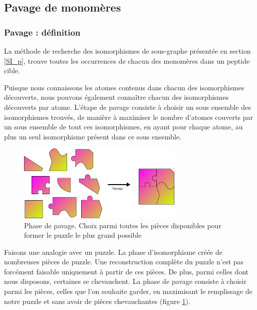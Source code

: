 \subsection{Pavage de monomères}
\label{pavage_}

\subsubsection{Pavage : définition}

La méthode de recherche des isomorphismes de sous-graphe présentée en section \ref{SI_p}, trouve toutes les occurrences de chacun des monomères dans un peptide cible.

Puisque nous connaissons les atomes contenus dans chacun des isomorphismes découverts, nous pouvons également connaître chacun des isomorphismes découverts par atome.
L'étape de pavage consiste à choisir un sous ensemble des isomorphismes trouvés, de manière à maximiser le nombre d'atomes couverts par un sous ensemble de tout ces isomorphismes, en ayant pour chaque atome, au plus un seul isomorphisme présent dans ce sous ensemble.

\begin{figure}[!ht]
  \begin{center}
    \includegraphics[width=300px]{Figures/s2m/pavage/puzzle.png}
    \caption{\label{puzzle}Phase de pavage.
    Choix parmi toutes les pièces disponibles pour former le puzzle le plus grand possible}
  \end{center}
\end{figure}

Faisons une analogie avec un puzzle. La phase d'isomorphisme créée de nombreuses pièces de puzzle.
Une reconstruction complète du puzzle n'est pas forcément faisable uniquement à partir de ces pièces.
De plus, parmi celles dont nous disposons, certaines se chevauchent.
La phase de pavage consiste à choisir parmi les pièces, celles que l'on souhaite garder, en maximisant le remplissage de notre puzzle et sans avoir de pièces chevauchantes (figure \ref{puzzle}).

